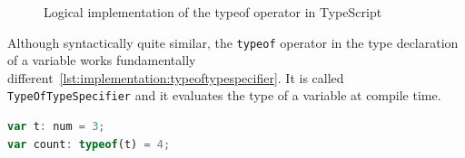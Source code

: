 \begin{figure}[tb]
	\centering
	\def\stackalignment{r}
	\caption{Logical implementation of the typeof operator in TypeScript}
	\label{fig:implementation:typeofimplementation}
\end{figure}

Although syntactically quite similar, the \lstinline|typeof| operator in the type declaration of a variable works fundamentally different~\ref{lst:implementation:typeoftypespecifier}. It is called \lstinline|TypeOfTypeSpecifier| and it evaluates the type of a variable at compile time.

\begin{lstlisting}[language=Typescript,caption=Specifying the type based on a reference variable, label=lst:implementation:typeoftypespecifier]
var t: num = 3;
var count: typeof(t) = 4;
\end{lstlisting}

